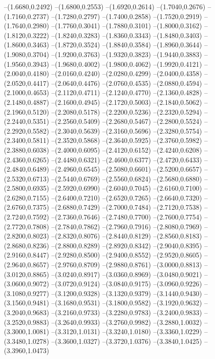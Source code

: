 {\begin{scope}
--(1.6680,0.2492)
--(1.6800,0.2553)
--(1.6920,0.2614)
--(1.7040,0.2676)
--(1.7160,0.2737)
--(1.7280,0.2797)
--(1.7400,0.2858)
--(1.7520,0.2919)
--(1.7640,0.2980)
--(1.7760,0.3041)
--(1.7880,0.3101)
--(1.8000,0.3162)
--(1.8120,0.3222)
--(1.8240,0.3283)
--(1.8360,0.3343)
--(1.8480,0.3403)
--(1.8600,0.3463)
--(1.8720,0.3524)
--(1.8840,0.3584)
--(1.8960,0.3644)
--(1.9080,0.3704)
--(1.9200,0.3763)
--(1.9320,0.3823)
--(1.9440,0.3883)
--(1.9560,0.3943)
--(1.9680,0.4002)
--(1.9800,0.4062)
--(1.9920,0.4121)
--(2.0040,0.4180)
--(2.0160,0.4240)
--(2.0280,0.4299)
--(2.0400,0.4358)
--(2.0520,0.4417)
--(2.0640,0.4476)
--(2.0760,0.4535)
--(2.0880,0.4594)
--(2.1000,0.4653)
--(2.1120,0.4711)
--(2.1240,0.4770)
--(2.1360,0.4828)
--(2.1480,0.4887)
--(2.1600,0.4945)
--(2.1720,0.5003)
--(2.1840,0.5062)
--(2.1960,0.5120)
--(2.2080,0.5178)
--(2.2200,0.5236)
--(2.2320,0.5294)
--(2.2440,0.5351)
--(2.2560,0.5409)
--(2.2680,0.5467)
--(2.2800,0.5524)
--(2.2920,0.5582)
--(2.3040,0.5639)
--(2.3160,0.5696)
--(2.3280,0.5754)
--(2.3400,0.5811)
--(2.3520,0.5868)
--(2.3640,0.5925)
--(2.3760,0.5982)
--(2.3880,0.6038)
--(2.4000,0.6095)
--(2.4120,0.6152)
--(2.4240,0.6208)
--(2.4360,0.6265)
--(2.4480,0.6321)
--(2.4600,0.6377)
--(2.4720,0.6433)
--(2.4840,0.6489)
--(2.4960,0.6545)
--(2.5080,0.6601)
--(2.5200,0.6657)
--(2.5320,0.6713)
--(2.5440,0.6769)
--(2.5560,0.6824)
--(2.5680,0.6880)
--(2.5800,0.6935)
--(2.5920,0.6990)
--(2.6040,0.7045)
--(2.6160,0.7100)
--(2.6280,0.7155)
--(2.6400,0.7210)
--(2.6520,0.7265)
--(2.6640,0.7320)
--(2.6760,0.7375)
--(2.6880,0.7429)
--(2.7000,0.7484)
--(2.7120,0.7538)
--(2.7240,0.7592)
--(2.7360,0.7646)
--(2.7480,0.7700)
--(2.7600,0.7754)
--(2.7720,0.7808)
--(2.7840,0.7862)
--(2.7960,0.7916)
--(2.8080,0.7969)
--(2.8200,0.8023)
--(2.8320,0.8076)
--(2.8440,0.8129)
--(2.8560,0.8183)
--(2.8680,0.8236)
--(2.8800,0.8289)
--(2.8920,0.8342)
--(2.9040,0.8395)
--(2.9160,0.8447)
--(2.9280,0.8500)
--(2.9400,0.8552)
--(2.9520,0.8605)
--(2.9640,0.8657)
--(2.9760,0.8709)
--(2.9880,0.8761)
--(3.0000,0.8813)
--(3.0120,0.8865)
--(3.0240,0.8917)
--(3.0360,0.8969)
--(3.0480,0.9021)
--(3.0600,0.9072)
--(3.0720,0.9124)
--(3.0840,0.9175)
--(3.0960,0.9226)
--(3.1080,0.9277)
--(3.1200,0.9328)
--(3.1320,0.9379)
--(3.1440,0.9430)
--(3.1560,0.9481)
--(3.1680,0.9531)
--(3.1800,0.9582)
--(3.1920,0.9632)
--(3.2040,0.9683)
--(3.2160,0.9733)
--(3.2280,0.9783)
--(3.2400,0.9833)
--(3.2520,0.9883)
--(3.2640,0.9933)
--(3.2760,0.9982)
--(3.2880,1.0032)
--(3.3000,1.0081)
--(3.3120,1.0131)
--(3.3240,1.0180)
--(3.3360,1.0229)
--(3.3480,1.0278)
--(3.3600,1.0327)
--(3.3720,1.0376)
--(3.3840,1.0425)
--(3.3960,1.0473)

\end{scope}}
